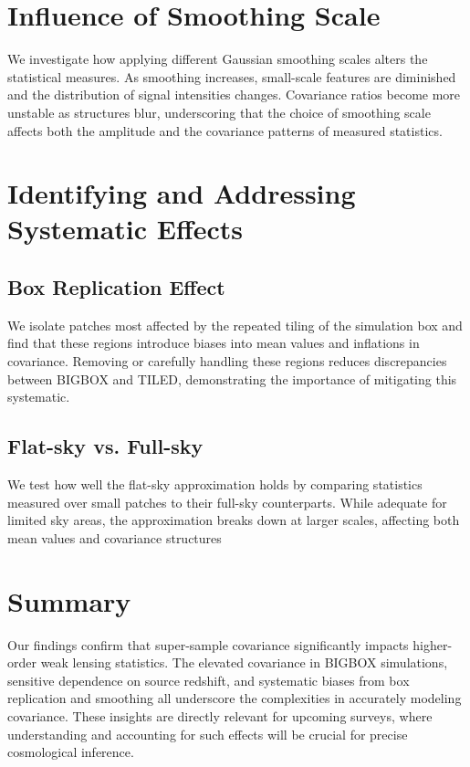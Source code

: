 \section{Influence of Smoothing Scale}
We investigate how applying different Gaussian smoothing scales alters the statistical measures. As smoothing increases, small-scale features are diminished and the distribution of signal intensities changes. Covariance ratios become more unstable as structures blur, underscoring that the choice of smoothing scale affects both the amplitude and the covariance patterns of measured statistics.

\section{Identifying and Addressing Systematic Effects}
\subsection{Box Replication Effect}
We isolate patches most affected by the repeated tiling of the simulation box and find that these regions introduce biases into mean values and inflations in covariance. Removing or carefully handling these regions reduces discrepancies between BIGBOX and TILED, demonstrating the importance of mitigating this systematic.

\subsection{Flat-sky vs. Full-sky}
We test how well the flat-sky approximation holds by comparing statistics measured over small patches to their full-sky counterparts. While adequate for limited sky areas, the approximation breaks down at larger scales, affecting both mean values and covariance structures

\section{Summary}
Our findings confirm that super-sample covariance significantly impacts higher-order weak lensing statistics. The elevated covariance in BIGBOX simulations, sensitive dependence on source redshift, and systematic biases from box replication and smoothing all underscore the complexities in accurately modeling covariance. These insights are directly relevant for upcoming surveys, where understanding and accounting for such effects will be crucial for precise cosmological inference.




